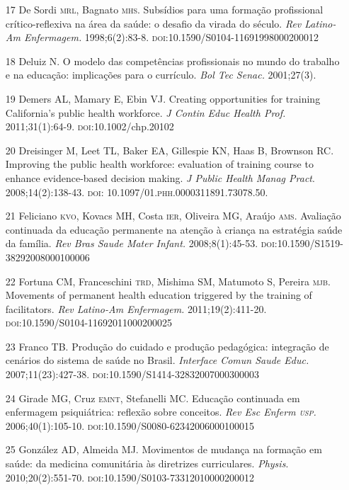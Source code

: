 \documentclass{article}
\begin{document}
\begin{itemize}
\item[17] De Sordi \textsc{mrl}, Bagnato \textsc{mhs}. Subsídios para uma formação profissional
crítico-reflexiva na área da saúde: o desafio da virada do século. \textit{Rev
Latino-Am Enfermagem.}
1998;6(2):83-8. \textsc{doi}:10.1590/S0104-11691998000200012

\item[18] Deluiz N. O modelo das competências profissionais no mundo do trabalho
e na educação: implicações para o currículo. \textit{Bol Tec Senac.}
2001;27(3).

\item[19] Demers AL, Mamary E, Ebin VJ. Creating opportunities for training
California’s public health workforce. \textit{J Contin Educ Health Prof.}
2011;31(1):64-9. \textsc{doi}:10.1002/chp.20102

\item[20] Dreisinger M, Leet TL, Baker EA, Gillespie KN, Haas B, Brownson RC.
Improving the public health workforce: evaluation of training course to enhance
evidence-based decision making. \textit{J Public Health Manag Pract}. 2008;14(2):138-43. \textsc{doi}: 10.1097/01.\textsc{phh}.0000311891.73078.50.

\item[21] Feliciano \textsc{kvo}, Kovacs MH, Costa \textsc{ier}, Oliveira MG, Araújo \textsc{ams}.
Avaliação continuada da educação permanente na atenção à criança na estratégia
saúde da família. \textit{Rev Bras Saude Mater Infant.}
2008;8(1):45-53. \textsc{doi}:10.1590/S1519-38292008000100006

\item[22] Fortuna CM, Franceschini \textsc{trd}, Mishima SM, Matumoto S, Pereira \textsc{mjb}.
Movements of permanent health education triggered by the training of
facilitators. \textit{Rev Latino-Am Enfermagem.}
2011;19(2):411-20. \textsc{doi}:10.1590/S0104-11692011000200025

\item[23] Franco TB. Produção do cuidado e produção pedagógica: integração de
cenários do sistema de saúde no Brasil. \textit{Interface Comun Saude Educ.}
2007;11(23):427-38. \textsc{doi}:10.1590/S1414-32832007000300003

\item[24] Girade MG, Cruz \textsc{emnt}, Stefanelli MC. Educação continuada em enfermagem
psiquiátrica: reflexão sobre conceitos. \textit{Rev Esc Enferm \textsc{usp}.}
2006;40(1):105-10. \textsc{doi}:10.1590/S0080-62342006000100015

\item[25] González AD, Almeida MJ. Movimentos de mudança na formação em saúde:
da medicina comunitária às diretrizes curriculares. \textit{Physis}. 2010;20(2):551-70. \textsc{doi}:10.1590/S0103-73312010000200012


\end{itemize}
\end{document}
